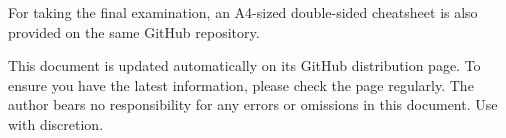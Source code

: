 \documentclass[10pt]{article}
\begin{document}
\setlength{\abovedisplayskip}{3pt}
\setlength{\belowdisplayskip}{3pt}
\setlength{\abovedisplayshortskip}{0pt}
\setlength{\belowdisplayshortskip}{0pt}

\maketitle


\tableofcontents
\listoffigures

\vfill

\begin{remark}
    For taking the final examination, an A4-sized double-sided cheatsheet
    is also provided on the same GitHub repository.
\end{remark}

{
\footnotesize
This document is updated automatically on its GitHub distribution page.
To ensure you have the latest information, please check the page regularly.
The author bears no responsibility for any errors or omissions in this document.
Use with discretion.
}


\end{document}
